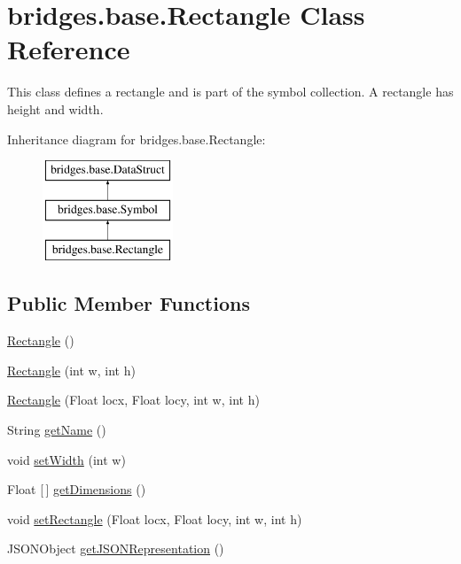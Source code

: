 \hypertarget{classbridges_1_1base_1_1_rectangle}{}\section{bridges.\+base.\+Rectangle Class Reference}
\label{classbridges_1_1base_1_1_rectangle}


This class defines a rectangle and is part of the symbol collection. A rectangle has height and width.  


Inheritance diagram for bridges.\+base.\+Rectangle\+:\begin{figure}[H]
\begin{center}
\leavevmode
\includegraphics[height=3.000000cm]{classbridges_1_1base_1_1_rectangle}
\end{center}
\end{figure}
\subsection*{Public Member Functions}
\begin{DoxyCompactItemize}
\item 
\mbox{\hyperlink{classbridges_1_1base_1_1_rectangle_a6d80c63a14e9b94df552dac422348dc3}{Rectangle}} ()
\item 
\mbox{\hyperlink{classbridges_1_1base_1_1_rectangle_a8e7e936bf76b597c097a9786cf02cf77}{Rectangle}} (int w, int h)
\item 
\mbox{\hyperlink{classbridges_1_1base_1_1_rectangle_ade3310629f09ee38c57853108d387628}{Rectangle}} (Float locx, Float locy, int w, int h)
\item 
String \mbox{\hyperlink{classbridges_1_1base_1_1_rectangle_ab785b45f264ae3cd61a5a898ffa6afba}{get\+Name}} ()
\item 
void \mbox{\hyperlink{classbridges_1_1base_1_1_rectangle_a803ca26bb6bb0c29c9316d910fce0fe1}{set\+Width}} (int w)
\item 
Float \mbox{[}$\,$\mbox{]} \mbox{\hyperlink{classbridges_1_1base_1_1_rectangle_a9a903d4617cde354f617ac4e8625fa38}{get\+Dimensions}} ()
\item 
void \mbox{\hyperlink{classbridges_1_1base_1_1_rectangle_a7f071805534af749355f3d6122972ab9}{set\+Rectangle}} (Float locx, Float locy, int w, int h)
\item 
J\+S\+O\+N\+Object \mbox{\hyperlink{classbridges_1_1base_1_1_rectangle_ad9a44cbdc301594b8708769461ad4461}{get\+J\+S\+O\+N\+Representation}} ()
\end{DoxyCompactItemize}
